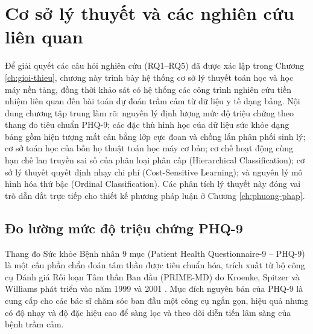 \chapter{Cơ sở lý thuyết và các nghiên cứu liên quan}
\label{ch:co-so-ly-thuyet}

Để giải quyết các câu hỏi nghiên cứu (RQ1--RQ5) đã được xác lập trong Chương \ref{ch:gioi-thieu}, chương này trình bày hệ thống cơ sở lý thuyết toán học và học máy nền tảng, đồng thời khảo sát có hệ thống các công trình nghiên cứu tiền nhiệm liên quan đến bài toán dự đoán trầm cảm từ dữ liệu y tế dạng bảng. Nội dung chương tập trung làm rõ: nguyên lý định lượng mức độ triệu chứng theo thang đo tiêu chuẩn PHQ-9; các đặc thù hình học của dữ liệu sức khỏe dạng bảng gồm hiện tượng mất cân bằng lớp cực đoan và chồng lấn phân phối sinh lý; cơ sở toán học của bốn họ thuật toán học máy cơ bản; cơ chế hoạt động cùng hạn chế lan truyền sai số của phân loại phân cấp (Hierarchical Classification); cơ sở lý thuyết quyết định nhạy chi phí (Cost-Sensitive Learning); và nguyên lý mô hình hóa thứ bậc (Ordinal Classification). Các phân tích lý thuyết này đóng vai trò dẫn dắt trực tiếp cho thiết kế phương pháp luận ở Chương \ref{ch:phuong-phap}.

\section{Đo lường mức độ triệu chứng PHQ-9}
\label{sec:do-luong-phq9}

Thang đo Sức khỏe Bệnh nhân 9 mục (Patient Health Questionnaire-9 -- PHQ-9) là một cấu phần chẩn đoán tâm thần được tiêu chuẩn hóa, trích xuất từ bộ công cụ Đánh giá Rối loạn Tâm thần Ban đầu (PRIME-MD) do Kroenke, Spitzer và Williams phát triển vào năm 1999 và 2001 \cite{kroenke2001phq, spitzer1999validation}. Mục đích nguyên bản của PHQ-9 là cung cấp cho các bác sĩ chăm sóc ban đầu một công cụ ngắn gọn, hiệu quả nhưng có độ nhạy và độ đặc hiệu cao để sàng lọc và theo dõi diễn tiến lâm sàng của bệnh trầm cảm.

